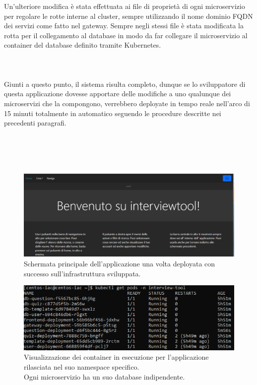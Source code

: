 \documentclass[a4paper,12pt]{report}
\begin{document}
Un'ulteriore modifica è stata effettuata ai file di proprietà di ogni microservizio per regolare le rotte interne al cluster, sempre utilizzando il nome dominio FQDN dei servizi come fatto nel gateway. Sempre negli stessi file è stata modificata la rotta per il collegamento al database in modo da far collegare il microservizio al container del database definito tramite Kubernetes.\\ \\ \\ \\
Giunti a questo punto, il sistema risulta completo, dunque se lo sviluppatore di questa applicazione dovesse apportare delle modifiche a uno qualunque dei microservizi che la compongono, verrebbero deployate in tempo reale nell'arco di 15 minuti totalmente in automatico seguendo le procedure descritte nei precedenti paragrafi. \\ \\ \\ \\ \\ 


\begin{figure}[h]
	\includegraphics[width=1.0\textwidth]{app_micro}
    \caption{Schermata principale dell'applicazione una volta deployata con successo sull'infrastruttura sviluppata.}
    \label{fig:app_micro}
\end{figure}

\begin{figure}[h]
	\includegraphics[width=1.0\textwidth]{app_micro2}
    \caption{Visualizzazione dei container in esecuzione per l'applicazione rilasciata nel suo namespace specifico. \\Ogni microservizio ha un suo database indipendente.}
    \label{fig:app_micro2}
\end{figure}
\end{document}

